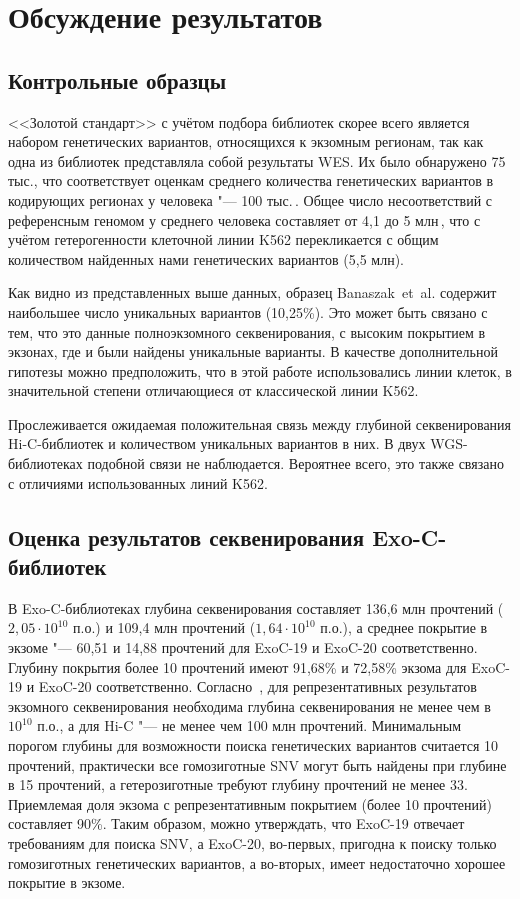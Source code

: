 \documentclass[a4paper,14pt]{extarticle}
\begin{document}
\section{Обсуждение результатов}

\subsection{Контрольные образцы}

<<Золотой стандарт>> с учётом подбора библиотек скорее всего является набором генетических вариантов, относящихся к экзомным регионам, так как одна из библиотек представляла собой результаты WES.
Их было обнаружено 75 тыс., что соответствует оценкам среднего количества генетических вариантов в кодирующих регионах у человека "--- 100 тыс.\,\cite{Supernat_2018}.
Общее число несоответствий с референсным геномом у среднего человека составляет от 4,1 до 5 млн\,\cite{Auton_2015}, что с учётом гетерогенности клеточной линии K562 перекликается с общим количеством найденных нами генетических вариантов (5,5 млн).

Как видно из представленных выше данных, образец Banaszak~et~al. содержит наибольшее число уникальных вариантов (10,25\%).
Это может быть связано с тем, что это данные полноэкзомного секвенирования, с высоким покрытием в экзонах, где и были найдены уникальные варианты.
В качестве дополнительной гипотезы можно предположить, что в этой работе использовались линии клеток, в значительной степени отличающиеся от классической линии K562.

Прослеживается ожидаемая положительная связь между глубиной секвенирования Hi-C\hyp{}библиотек и количеством уникальных вариантов в них.
В двух WGS\hyp{}библиотеках подобной связи не наблюдается.
Вероятнее всего, это также связано с отличиями использованных линий K562.

\subsection{Оценка результатов секвенирования Exo-C\hyp{}библиотек}

В Exo-C\hyp{}библиотеках глубина секвенирования составляет 136,6 млн прочтений ($2,05 \cdot 10^{10}$ п.о.) и 109,4 млн прочтений ($1,64 \cdot 10^{10}$ п.о.), а среднее покрытие в экзоме "--- 60,51 и 14,88 прочтений для ExoC-19 и ExoC-20 соответственно.
Глубину покрытия более 10 прочтений имеют 91,68\% и 72,58\% экзома для ExoC-19 и ExoC-20 соответственно.
Согласно \,\cite{Sims_2014}, для репрезентативных результатов экзомного секвенирования необходима глубина секвенирования не менее чем в $10^{10}$ п.о., а для Hi-C "--- не менее чем 100 млн прочтений.
Минимальным порогом глубины для возможности поиска генетических вариантов считается 10 прочтений, практически все гомозиготные SNV могут быть найдены при глубине в 15 прочтений, а гетерозиготные требуют глубину прочтений не менее 33.
Приемлемая доля экзома с репрезентативным покрытием (более 10 прочтений) составляет 90\%.
Таким образом, можно утверждать, что ExoC-19 отвечает требованиям для поиска SNV, а ExoC-20, во-первых, пригодна к поиску только гомозиготных генетических вариантов, а во-вторых, имеет недостаточно хорошее покрытие в экзоме.
\end{document}
